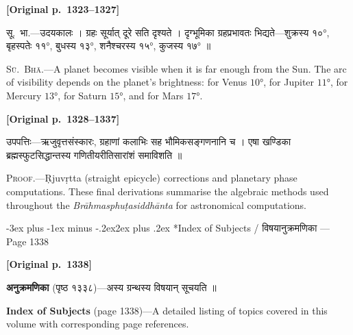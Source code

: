 \documentclass[11pt,a4paper]{article}
\makeatletter
\renewcommand{\section}{\@startsection {section}{1}{\z@}%
  {-3ex plus -1ex minus -.2ex}{2ex plus .2ex}%
  {\normalfont\Large\bfseries\color{sectioncolor}}}
\newcommand{\dev}[1]{{\devanagarifont\mdseries\upshape #1}}
\newcommand{\pagelabel}[1]{\textcolor{sectioncolor}{\textbf{[Original p.~#1]}}}
\newcommand{\bilingualpair}[2]{%
  \noindent%
  \begin{minipage}[t]{0.47\textwidth}
    \begin{flushleft}
      \small\dev{#1}
    \end{flushleft}
  \end{minipage}%
  \hfill\vrule\hfill%
  \begin{minipage}[t]{0.47\textwidth}
    \begin{flushleft}
      \small #2
    \end{flushleft}
  \end{minipage}%
  \par\vspace{1.2ex}
}
\makeatother
\begin{document}
\vspace{0.5ex}
\pagelabel{1323--1327}

\bilingualpair{%
सू.~भा.---उदयकालः । ग्रहः सूर्यात् दूरे सति दृश्यते । दृग्भूमिका ग्रहप्रभावतः भिद्यते---शुक्रस्य $१०°$, बृहस्पतेः $११°$, बुधस्य $१३°$, शनैश्चरस्य $१५°$, कुजस्य $१७°$ ॥
}{%
\textsc{Sū.~Bhā.}---A planet becomes visible when it is far enough from the Sun. The arc of visibility depends on the planet's brightness: for Venus $10°$, for Jupiter $11°$, for Mercury $13°$, for Saturn $15°$, and for Mars $17°$.
}

\vspace{0.5ex}
\pagelabel{1328--1337}

\bilingualpair{%
उपपत्तिः---ऋजुवृत्तसंस्कारः, ग्रहाणां कलाभिः सह भौमिकसङ्गणनानि च । एषा खण्डिका ब्रह्मस्फुटसिद्धान्तस्य गणितीयरीतिसारांशं समाविशति ॥
}{%
\textsc{Proof.}---Ṛjuvṛtta (straight epicycle) corrections and planetary phase computations. These final derivations summarise the algebraic methods used throughout the \textit{Brāhmasphuṭasiddhānta} for astronomical computations.
}

\newpage

\section*{Index of Subjects / \dev{विषयानुक्रमणिका} --- Page 1338}

\pagelabel{1338}

\bilingualpair{%
\textbf{अनुक्रमणिका} (पृष्ठ १३३८)---अस्य ग्रन्थस्य विषयान् सूचयति ॥
}{%
\textbf{Index of Subjects} (page 1338)---A detailed listing of topics covered in this volume with corresponding page references.
}

\vspace{1ex}
\end{document}
